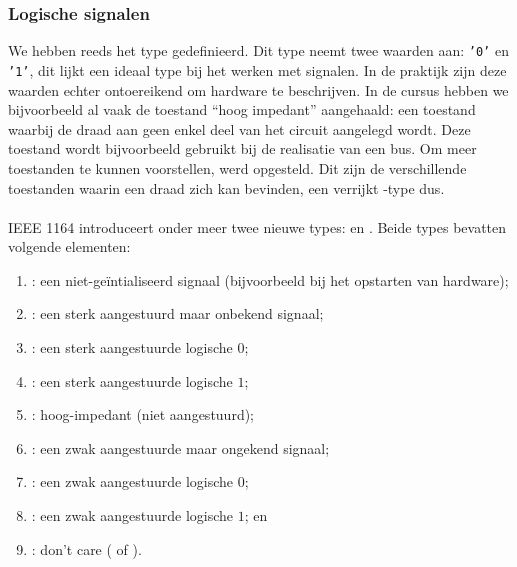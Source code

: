 \subsubsection{Logische signalen}

We hebben reeds het type  gedefinieerd. Dit type neemt twee waarden aan: \texttt{'0'} en \texttt{'1'}, dit lijkt een ideaal type bij het werken met signalen. In de praktijk zijn deze waarden echter ontoereikend om hardware te beschrijven. In de cursus hebben we bijvoorbeeld al vaak de toestand ``hoog impedant'' aangehaald: een toestand waarbij de draad aan geen enkel deel van het circuit aangelegd wordt. Deze toestand wordt bijvoorbeeld gebruikt bij de realisatie van een bus. Om meer toestanden te kunnen voorstellen, werd  opgesteld. Dit zijn de verschillende toestanden waarin een draad zich kan bevinden, een verrijkt -type dus.

\paragraph{}
IEEE 1164 introduceert onder meer twee nieuwe types:  en . Beide types bevatten volgende elementen:
\begin{enumerate}
 \item {}: een niet-ge\"intialiseerd signaal (bijvoorbeeld bij het opstarten van hardware);
 \item {}: een sterk aangestuurd maar onbekend signaal;
 \item {}: een sterk aangestuurde logische $0$;
 \item {}: een sterk aangestuurde logische $1$; 
 \item {}: hoog-impedant (niet aangestuurd);
 \item {}: een zwak aangestuurde maar ongekend signaal;
 \item {}: een zwak aangestuurde logische $0$;
 \item {}: een zwak aangestuurde logische $1$; en
 \item {}: don't care ( of ).
\end{enumerate}


